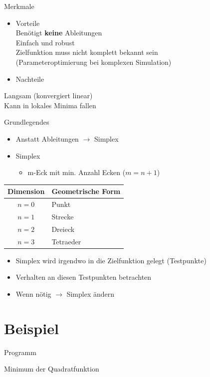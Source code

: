 \documentclass[\outputformat]{beamer}
\begin{document}
\begin{frame}{Merkmale}
	\begin{itemize}
		\item Vorteile\\
			\qquad Benötigt \textbf{keine} Ableitungen\\
			\qquad Einfach und robust\\
			\qquad Zielfunktion muss nicht komplett bekannt sein \\
			\qquad (Parameteroptimierung bei komplexen Simulation)
			
	\end{itemize}
	\begin{itemize}
		\item Nachteile\\
	\end{itemize}
	\qquad Langsam (konvergiert linear)\\
	\qquad Kann in lokales Minima fallen\\
	    
\end{frame}

\begin{frame}{Grundlegendes}
	\begin{itemize}
		\item Anstatt Ableitungen $\rightarrow$ Simplex
		\item Simplex
			\begin{itemize}
				\item m-Eck mit min. Anzahl Ecken ($m=n+1$)\\
			\end{itemize}
	\end{itemize}
	\begin{tabular}{c|l}
	Dimension & Geometrische Form\\
	\hline
	$n=0$ & Punkt\\
	$n=1$ & Strecke\\
	$n=2$ & Dreieck\\
	$n=3$ & Tetraeder
	\end{tabular} 
	\begin{itemize}
		\item Simplex wird irgendwo in die Zielfunktion gelegt (Testpunkte)
		\item Verhalten an diesen Testpunkten betrachten
		\item Wenn nötig $\rightarrow$ Simplex ändern
	\end{itemize}
\end{frame}



\section{Beispiel}
\begin{frame}{Programm}\tableofcontents[currentsection]\end{frame}

\begin{frame}{Minimum der Quadratfunktion}

\end{frame}
\end{document}
